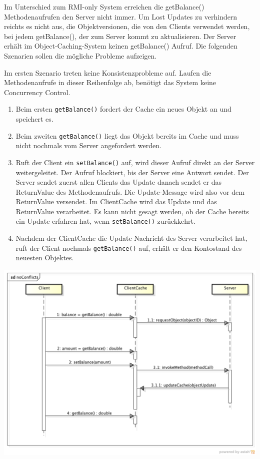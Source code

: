 Im Unterschied zum RMI-only System erreichen die getBalance() Methodenaufrufen den Server nicht immer. Um Lost Updates zu verhindern reichts es nicht aus, die Objektversionen, die von den Clients verwendet werden, bei jedem getBalance(), der zum Server kommt zu aktualisieren. Der Server erhält im Object-Caching-System keinen getBalance() Aufruf. Die folgenden Szenarien sollen die mögliche Probleme aufzeigen.

Im ersten Szenario treten keine Konsistenzprobleme auf. Laufen die Methodenaufrufe in dieser Reihenfolge ab, benötigt das System keine Concurrency Control.
\begin{enumerate}
\item Beim ersten \verb|getBalance()| fordert der Cache ein neues Objekt an und speichert es.
\item Beim zweiten \verb|getBalance()|  liegt das Objekt bereits im Cache und muss nicht nochmals vom Server angefordert werden.
\item Ruft der Client ein \verb|setBalance()| auf, wird dieser Aufruf direkt an der Server weitergeleitet. Der Aufruf blockiert, bis der Server eine Antwort sendet. Der Server sendet zuerst allen Clients das Update danach sendet er das ReturnValue des Methodenaufrufs. Die Update-Message wird also vor dem ReturnValue versendet. Im ClientCache wird das Update und das ReturnValue verarbeitet. Es kann nicht gesagt werden, ob der Cache bereits ein Update erfahren hat, wenn  \verb|setBalance()|  zurückkehrt.
\item Nachdem der ClientCache die Update Nachricht des Server verarbeitet hat, ruft der Client nochmals \verb|getBalance()| auf, erhält er den Kontostand des neuesten Objektes.
\end{enumerate}

\includegraphics[scale=0.3]{image_testFramework/conflictscenario_noconflict}


